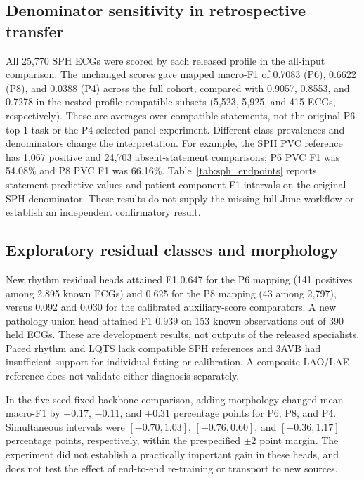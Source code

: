 \subsection{Denominator sensitivity in retrospective transfer}
\label{sec:transfer-results}

All 25,770 SPH ECGs were scored by each released profile in the all-input comparison. The unchanged scores gave mapped macro-F1 of 0.7083 (P6), 0.6622 (P8), and 0.0388 (P4) across the full cohort, compared with 0.9057, 0.8553, and 0.7278 in the nested profile-compatible subsets (5,523, 5,925, and 415 ECGs, respectively). These are averages over compatible statements, not the original P6 top-1 task or the P4 selected panel experiment. Different class prevalences and denominators change the interpretation. For example, the SPH PVC reference has 1,067 positive and 24,703 absent-statement comparisons; P6 PVC F1 was 54.08\% and P8 PVC F1 was 66.16\%. Table~\ref{tab:sph_endpoints} reports statement predictive values and patient-component F1 intervals on the original SPH denominator. These results do not supply the missing full June workflow or establish an independent confirmatory result.



\subsection{Exploratory residual classes and morphology}
\label{sec:other-results}

New rhythm residual heads attained F1 0.647 for the P6 mapping (141 positives among 2,895 known ECGs) and 0.625 for the P8 mapping (43 among 2,797), versus 0.092 and 0.030 for the calibrated auxiliary-score comparators. A new pathology union head attained F1 0.939 on 153 known observations out of 390 held ECGs. These are development results, not outputs of the released specialists. Paced rhythm and LQTS lack compatible SPH references and 3AVB had insufficient support for individual fitting or calibration. A composite LAO/LAE reference does not validate either diagnosis separately.

In the five-seed fixed-backbone comparison, adding morphology changed mean macro-F1 by $+0.17$, $-0.11$, and $+0.31$ percentage points for P6, P8, and P4. Simultaneous intervals were $[-0.70,1.03]$, $[-0.76,0.60]$, and $[-0.36,1.17]$ percentage points, respectively, within the prespecified $\pm2$ point margin. The experiment did not establish a practically important gain in these heads, and does not test the effect of end-to-end re-training or transport to new sources.

